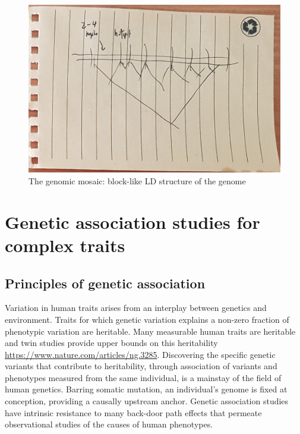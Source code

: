 \begin{outline}
\begin{figure}
    \centering
    \includegraphics[width=1.0\textwidth,page=1]{mainmatter/figures/chapter_01/fig_mockup_haplotypeBlocks_Screenshot 2020-05-21 at 17.08.33.png}
    \caption{The genomic mosaic: block-like \gls{LD} structure of the genome}
    \label{fig:intro_haplotypeBlocks}
\end{figure}

\section{Genetic association studies for complex traits}

\subsection{Principles of genetic association}

\1 Variation in human traits arises from an interplay between genetics and environment.
Traits for which genetic variation explains a non-zero fraction of phenotypic variation are heritable.
Many measurable human traits are heritable and twin studies provide upper bounds on this heritability \url{https://www.nature.com/articles/ng.3285}.
Discovering the specific genetic variants that contribute to heritability, through association of variants and phenotypes measured from the same individual, is a mainstay of the field of human genetics.
Barring somatic mutation, an individual's genome is fixed at conception, providing a causally upstream anchor.
Genetic association studies have intrinsic resistance to many back-door path effects that permeate observational studies of the causes of human phenotypes.


\end{outline}
